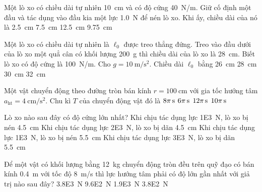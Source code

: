 \begin{ex}
	 Một lò xo có chiều dài tự nhiên \SI{10}{\centi\meter} và có độ cứng \SI{40}{\newton/\meter}. Giữ cố định một đầu và tác dụng vào đầu kia một lực \SI{1.0}{\newton} để nén lò xo. Khi ấy, chiều dài của nó là
	\choice
	{\SI{2.5}{\centi\meter}}
	{\True \SI{7.5}{\centi\meter}}
	{\SI{12.5}{\centi\meter}}
	{\SI{9.75}{\centi\meter}}
	\loigiai{}
\end{ex}
\begin{ex}
	Một lò xo có chiều dài tự nhiên là $\ell_0$ được treo thẳng đứng. Treo vào đầu dưới của lò xo một quẳ cân có khối lượng \SI{200}{\gram} thì chiều dài của lò xo là \SI{28}{\centi\meter}. Biết lò xo có độ cứng là \SI{100}{\newton/\meter}. Cho $g=\SI{10}{\meter/\second^2}$. Chiều dài $\ell_0$ bằng
	\choice
	{\SI{26}{\centi\meter}}
	{\SI{28}{\centi\meter}}
	{\SI{30}{\centi\meter}}
	{\SI{32}{\centi\meter}}
	\loigiai{}
\end{ex}
\begin{ex}
	Một vật chuyển động theo đường tròn bán kính $r=\SI{100}{\centi\meter}$ với gia tốc hướng tâm $a_{\mathrm{ht}}=\SI{4}{\centi\meter/\second^2}$. Chu kì $T$ của chuyển động vật đó là
	\choice
	{$\xsi{8\pi}{\second}$}
	{$\xsi{6\pi}{\second}$}
	{$\xsi{12\pi}{\second}$}
	{\True $\xsi{10\pi}{\second}$}
	\loigiai{}
\end{ex}
\begin{ex}
	Lò xo nào sau đây có độ cứng lớn nhất?
	\choice
	{Khi chịu tác dụng lực \SI{1E3}{\newton}, lò xo bị nén \SI{4.5}{\centi\meter}}
	{Khi chịu tác dụng lực \SI{2E3}{\newton}, lò xo bị dãn \SI{4.5}{\centi\meter}}
	{Khi chịu tác dụng lực \SI{1E3}{\newton}, lò xo bị nén \SI{5.5}{\centi\meter}}
	{\True Khi chịu tác dụng lực \SI{3E3}{\newton}, lò xo bị dãn \SI{5.5}{\centi\meter}}
	\loigiai{}
\end{ex}
\begin{ex}
	Để một vật có khối lượng bằng \SI{12}{\kilogram} chuyển động tròn đều trên quỹ đạo có bán kính \SI{0.4}{\meter} với tốc độ \SI{8}{\meter/\second} thì lực hướng tâm phải có độ lớn gần nhất với giả trị nào sau đây?
	\choice
	{\SI{3.8E3}{\newton}}
	{\SI{9.6E2}{\newton}}
	{\True \SI{1.9E3}{\newton}}
	{\SI{3.8E2}{\newton}}
	\loigiai{}
\end{ex}
